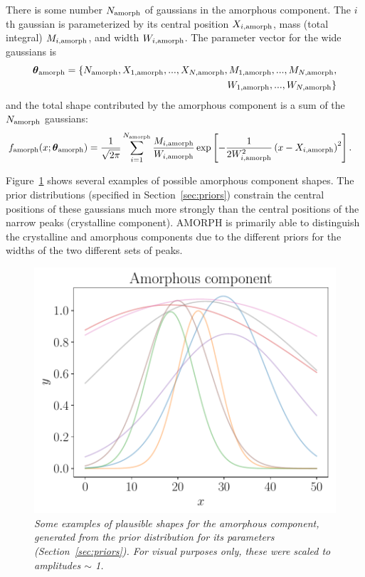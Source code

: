 \documentclass[review]{elsarticle}
\newcommand{\params}{\boldsymbol{\theta}}
\newcommand{\x}{x}
\newcommand{\changed}{\color{blue}}
\begin{document}
There is some number $N_{\rm amorph}$ of gaussians in the amorphous component.
The $i$th gaussian is parameterized
by its central position $X_{i, \rm amorph}$,
{\changed mass (total integral) $M_{i, \rm amorph}$}, and width $W_{i, \rm amorph}$.
The parameter vector for the wide gaussians is {\changed
\begin{align}
\params_{\rm amorph} =
  \{N_{\rm amorph}, X_{1, \rm amorph}, ..., X_{N, \rm amorph},
    M_{1, \rm amorph}, ..., M_{N, \rm amorph},\\
   \quad\quad W_{1, \rm amorph}, ..., W_{N, \rm amorph}\}
\end{align} } %
and the total shape contributed by the
amorphous component is a sum of the $N_{\rm amorph}$ gaussians: {\changed
\begin{align}
f_{\rm amorph}(\x; \params_{\rm amorph}) &=
	\frac{1}{\sqrt{2\pi}}
    \sum_{i=1}^{N_{\rm amorph}} \frac{M_{i, \rm amorph}}{W_{i, \rm amorph}}
 \exp\left[-\frac{1}{2W_{i, \rm amorph}^2}\left(x - X_{i, \rm amorph}\right)^2\right].
\end{align} } %

Figure~\ref{fig:wide_component} shows several examples of possible amorphous component shapes. The prior distributions (specified in
Section~\ref{sec:priors})
constrain the central positions of these gaussians much
more strongly than the central positions of the narrow peaks (crystalline component). AMORPH is primarily able to distinguish the crystalline
{\changed and amorphous components due to the different priors for the widths
of the two different sets of peaks.}


\begin{figure}[!ht]
\centering
\includegraphics[scale=0.7]{figures/wide_component.pdf}
\caption{\it Some examples of plausible shapes for the amorphous component,
generated from the prior distribution for its parameters
(Section~\ref{sec:priors}). For visual purposes only, these
were scaled to amplitudes $\sim$ 1. \label{fig:wide_component}}
\end{figure}
\end{document}
